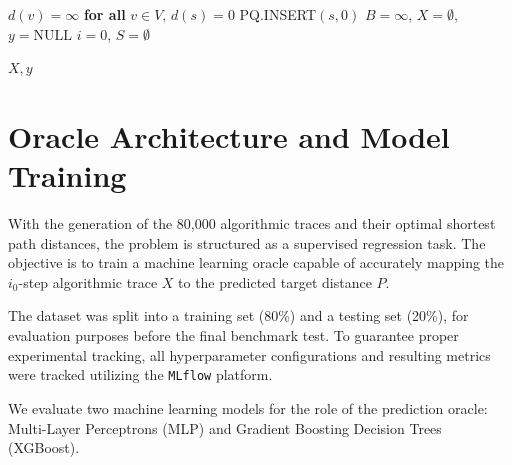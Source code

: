 \begin{algorithm}[htbp]
\caption{TRACE-EXTRACTOR ($G, s, T, i_0$)}
\label{alg:trace_extract}
$d(v) = \infty$ \textbf{for all} $v \in V$, $d(s) = 0$\;
PQ.INSERT$(s, 0)$\;
$B = \infty$, $X = \emptyset$, $y = \text{NULL}$\;
$i = 0$, $S = \emptyset$ 


\Return $X, y$
\end{algorithm}

\section{Oracle Architecture and Model Training}
\label{sec:oracle_training}

With the generation of the 80,000 algorithmic traces and their optimal shortest path distances, the problem is structured as a supervised regression task. The objective is to train a machine learning oracle capable of accurately mapping the $i_0$-step algorithmic trace $X$ to the predicted target distance $P$. 

The dataset was split into a training set (80\%) and a testing set (20\%), for evaluation purposes before the final benchmark test. To guarantee proper experimental tracking, all hyperparameter configurations and resulting metrics were tracked utilizing the \texttt{MLflow} platform.  

We evaluate two machine learning models for the role of the prediction oracle: Multi-Layer Perceptrons (MLP)\cite{rumelhartLearningRepresentationsBackpropagating1986} and Gradient Boosting Decision Trees (XGBoost)\cite{chenXGBoostScalableTree2016}.



